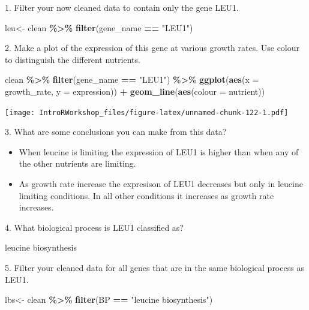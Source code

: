 \documentclass[
]{book}
\newenvironment{Shaded}{\begin{snugshade}}{\end{snugshade}}
\newcommand{\AttributeTok}[1]{\textcolor[rgb]{0.13,0.29,0.53}{#1}}
\newcommand{\FunctionTok}[1]{\textcolor[rgb]{0.13,0.29,0.53}{\textbf{#1}}}
\newcommand{\NormalTok}[1]{#1}
\newcommand{\OtherTok}[1]{\textcolor[rgb]{0.56,0.35,0.01}{#1}}
\newcommand{\SpecialCharTok}[1]{\textcolor[rgb]{0.81,0.36,0.00}{\textbf{#1}}}
\newcommand{\StringTok}[1]{\textcolor[rgb]{0.31,0.60,0.02}{#1}}
\providecommand{\tightlist}{%
  \setlength{\itemsep}{0pt}\setlength{\parskip}{0pt}}
\begin{document}
1. Filter your now cleaned data to contain only the gene LEU1.

\begin{Shaded}
\begin{Highlighting}[]
\NormalTok{leu}\OtherTok{\textless{}{-}}\NormalTok{ clean }\SpecialCharTok{\%\textgreater{}\%}
  \FunctionTok{filter}\NormalTok{(gene\_name }\SpecialCharTok{==} \StringTok{"LEU1"}\NormalTok{)}
\end{Highlighting}
\end{Shaded}

2. Make a plot of the expression of this gene at various growth rates. Use colour to distinguish the different nutrients.

\begin{Shaded}
\begin{Highlighting}[]
\NormalTok{clean }\SpecialCharTok{\%\textgreater{}\%}
  \FunctionTok{filter}\NormalTok{(gene\_name }\SpecialCharTok{==} \StringTok{"LEU1"}\NormalTok{) }\SpecialCharTok{\%\textgreater{}\%}
  \FunctionTok{ggplot}\NormalTok{(}\FunctionTok{aes}\NormalTok{(}\AttributeTok{x =}\NormalTok{ growth\_rate, }\AttributeTok{y =}\NormalTok{ expression)) }\SpecialCharTok{+}
    \FunctionTok{geom\_line}\NormalTok{(}\FunctionTok{aes}\NormalTok{(}\AttributeTok{colour =}\NormalTok{ nutrient))}
\end{Highlighting}
\end{Shaded}

\texttt{[image: IntroRWorkshop\_files/figure-latex/unnamed-chunk-122-1.pdf]}

3. What are some conclusions you can make from this data?

\begin{itemize}
\tightlist
\item
  When leucine is limiting the expression of LEU1 is higher than when any of the other nutrients are limiting.
\item
  As growth rate increase the expresison of LEU1 decreases but only in leucine limiting conditions. In all other conditions it increases as growth rate increases.
\end{itemize}

4. What biological process is LEU1 classified as?

leucine biosynthesis

5. Filter your cleaned data for all genes that are in the same biological process as LEU1.

\begin{Shaded}
\begin{Highlighting}[]
\NormalTok{lbs}\OtherTok{\textless{}{-}}\NormalTok{ clean }\SpecialCharTok{\%\textgreater{}\%}
  \FunctionTok{filter}\NormalTok{(BP }\SpecialCharTok{==} \StringTok{"leucine biosynthesis"}\NormalTok{)}
\end{Highlighting}
\end{Shaded}
\end{document}

